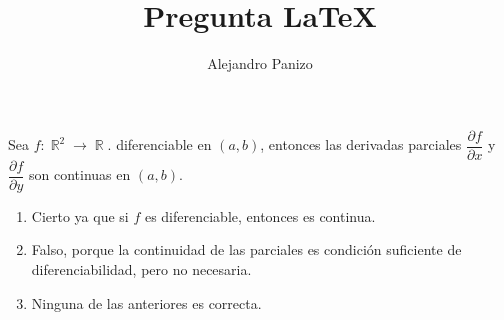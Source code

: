 \documentclass[10pt,spanish,hyperref={pdfpagelabels=false}]{beamer}
\author{Alejandro Panizo}
\title{Pregunta \LaTeX}
\DeclareMathOperator{\RR}{\mathbb{R}}
\begin{document}
\Large

\rightskip=0pt

\begin{frame}

Sea $f :\RR ^2 \to \RR$. diferenciable en $(a,b)$, entonces  las derivadas parciales  $\dfrac{\partial f}{\partial x} $ y $\dfrac{\partial f}{\partial y}$  son continuas en $(a,b)$.
\medskip



\begin{enumerate}[1.] \rightskip=0pt
\item Cierto ya que si $f$ es diferenciable, entonces es continua.
\item Falso, porque la continuidad de las parciales es condici\'{o}n suficiente de diferenciabilidad, pero no necesaria.
\item Ninguna de las anteriores es correcta.
\end{enumerate}


\end{frame}
\end{document}
